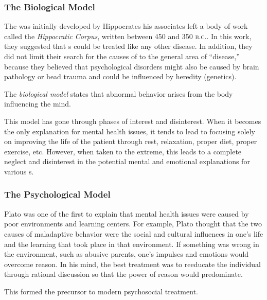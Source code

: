 \subsubsection{The Biological Model}\label{subsubsec:Biological_Model}
The  was initially developed by Hippocrates his associates left a body of work called the \textit{Hippocratic Corpus}, written between 450 and 350 \textsc{b.c.}.
In this work, they suggested that s could be treated like any other disease.
In addition, they did not limit their search for the causes of  to the general area of ``disease,'' because they believed that psychological disorders might also be caused by brain pathology or head trauma and could be influenced by heredity (genetics).

\begin{definition}\label{def:Biological_Model}
  The \emph{biological model} states that abnormal behavior arises from the body influencing the mind.
\end{definition}

This model has gone through phases of interest and disinterest.
When it becomes the only explanation for mental health issues, it tends to lead to focusing solely on improving the life of the patient through rest, relaxation, proper diet, proper exercise, etc.
However, when taken to the extreme, this leads to a complete neglect and disinterest in the potential mental and emotional explanations for various s.

\subsubsection{The Psychological Model}\label{subsubsec:Psychological_Model}
Plato was one of the first to explain that mental health issues were caused by poor environments and learning centers.
For example, Plato thought that the two causes of maladaptive behavior were the social and cultural influences in one’s life and the learning that took place in that environment.
If something was wrong in the environment, such as abusive parents, one’s impulses and emotions would overcome reason.
In his mind, the best treatment was to reeducate the individual through rational discussion so that the power of reason would predominate.

This formed the precursor to modern psychosocial treatment.

